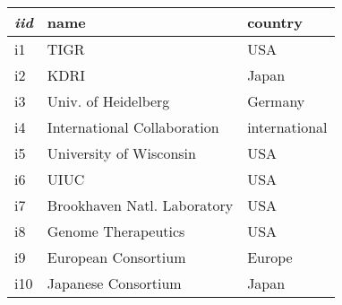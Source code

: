 \begin{tabular}{|l|l|l|}
\hline
 \textit{iid}  &            name              &    country    \\
\hline
 i1   & TIGR                         & USA\\
 i2   & KDRI                         & Japan\\
 i3   & Univ. of Heidelberg          & Germany\\
 i4   & International Collaboration  & international\\
 i5   & University of Wisconsin      & USA\\
 i6   & UIUC                         & USA\\
 i7   & Brookhaven Natl. Laboratory  & USA\\
 i8   & Genome Therapeutics          & USA\\
 i9   & European Consortium          & Europe\\
 i10  & Japanese Consortium          & Japan\\
\hline
\end{tabular}
